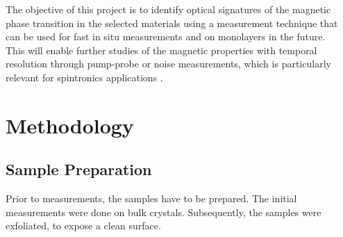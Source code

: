\documentclass[
	oneside,
	parskip=half,
	a4paper,
]{scrbook}
\begin{document}
The objective of this project is to identify optical signatures of the magnetic phase transition in the selected materials using a measurement technique that can be used for fast in situ measurements and on monolayers in the future.\\
This will enable further studies of the magnetic properties with temporal resolution through pump-probe or noise measurements, which is particularly relevant for spintronics applications \cite{AFM_review}.



\chapter{Methodology}
\section{Sample Preparation}
Prior to measurements, the samples have to be prepared.
The initial measurements were done on bulk crystals.
Subsequently, the samples were exfoliated, to expose a clean surface.
\end{document}
